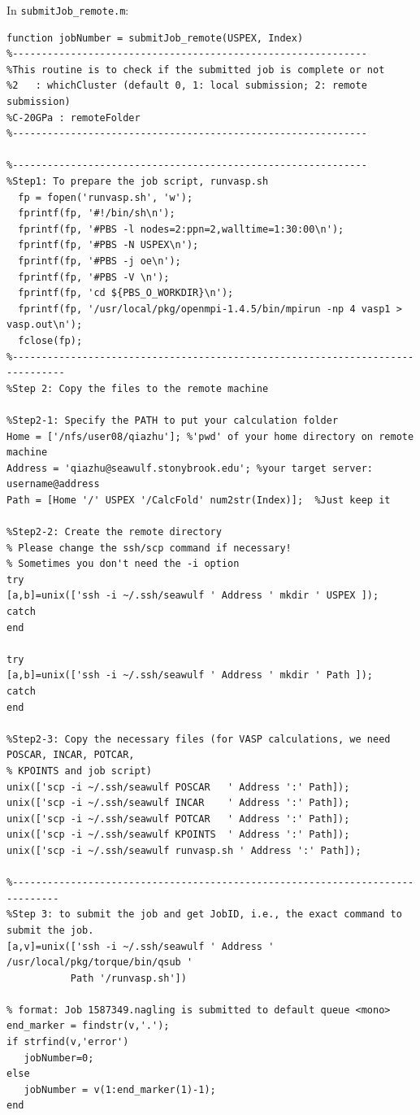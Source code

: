 \documentclass[12pt]{article}
\newcommand{\file}[1]{\texttt{#1}}
\begin{document}
\newpage
In \file{submitJob\_remote.m}:
\begin{lstlisting}
function jobNumber = submitJob_remote(USPEX, Index)
%-------------------------------------------------------------
%This routine is to check if the submitted job is complete or not
%2   : whichCluster (default 0, 1: local submission; 2: remote submission)
%C-20GPa : remoteFolder
%-------------------------------------------------------------

%-------------------------------------------------------------
%Step1: To prepare the job script, runvasp.sh
  fp = fopen('runvasp.sh', 'w');
  fprintf(fp, '#!/bin/sh\n');
  fprintf(fp, '#PBS -l nodes=2:ppn=2,walltime=1:30:00\n');
  fprintf(fp, '#PBS -N USPEX\n');
  fprintf(fp, '#PBS -j oe\n');
  fprintf(fp, '#PBS -V \n');
  fprintf(fp, 'cd ${PBS_O_WORKDIR}\n');
  fprintf(fp, '/usr/local/pkg/openmpi-1.4.5/bin/mpirun -np 4 vasp1 > vasp.out\n');
  fclose(fp);
%-------------------------------------------------------------------------------
%Step 2: Copy the files to the remote machine

%Step2-1: Specify the PATH to put your calculation folder
Home = ['/nfs/user08/qiazhu']; %'pwd' of your home directory on remote machine
Address = 'qiazhu@seawulf.stonybrook.edu'; %your target server: username@address
Path = [Home '/' USPEX '/CalcFold' num2str(Index)];  %Just keep it

%Step2-2: Create the remote directory 
% Please change the ssh/scp command if necessary! 
% Sometimes you don't need the -i option
try
[a,b]=unix(['ssh -i ~/.ssh/seawulf ' Address ' mkdir ' USPEX ]);  
catch
end

try
[a,b]=unix(['ssh -i ~/.ssh/seawulf ' Address ' mkdir ' Path ]);
catch
end

%Step2-3: Copy the necessary files (for VASP calculations, we need POSCAR, INCAR, POTCAR,
% KPOINTS and job script)
unix(['scp -i ~/.ssh/seawulf POSCAR   ' Address ':' Path]);
unix(['scp -i ~/.ssh/seawulf INCAR    ' Address ':' Path]);
unix(['scp -i ~/.ssh/seawulf POTCAR   ' Address ':' Path]);
unix(['scp -i ~/.ssh/seawulf KPOINTS  ' Address ':' Path]);
unix(['scp -i ~/.ssh/seawulf runvasp.sh ' Address ':' Path]);

%------------------------------------------------------------------------------
%Step 3: to submit the job and get JobID, i.e., the exact command to submit the job.
[a,v]=unix(['ssh -i ~/.ssh/seawulf ' Address ' /usr/local/pkg/torque/bin/qsub ' 
           Path '/runvasp.sh'])

% format: Job 1587349.nagling is submitted to default queue <mono>
end_marker = findstr(v,'.');
if strfind(v,'error')
   jobNumber=0;
else
   jobNumber = v(1:end_marker(1)-1);
end
\end{lstlisting}
\end{document}
